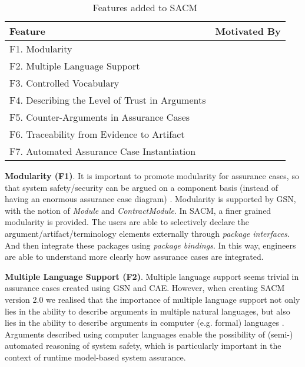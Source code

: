 \begin{table}[ht!]
	\centering
	\vspace{-1em}
	\begin{tabular}{|l|l|}
		\hline
		\textbf{Feature}               & \multicolumn{1}{c|}{\textbf{Motivated By}}                        \\ \hline
		F1. Modularity            & \multicolumn{1}{c|}{\cite{despotou2008investigating}} \\ \hline
		F2. Multiple Language Support &\multicolumn{1}{c|}{\cite{denney2013formal}}                  \\ \hline
		F3. Controlled Vocabulary &\multicolumn{1}{c|}{\cite{luo2015safety, attwood2014use}}                  \\ \hline
		F4. Describing the Level of Trust in Arguments &\multicolumn{1}{c|}{\cite{hawkins2011new, fenn2005putting}}                  \\ \hline
		F5. Counter-Arguments in Assurance Cases &\multicolumn{1}{c|}{\cite{armstrong2004deconstruction}}                  \\ \hline
		F6. Traceability from Evidence to Artifact &\multicolumn{1}{c|}{\cite{taguchi2014linking}}                  \\ \hline
		F7. Automated Assurance Case Instantiation &\multicolumn{1}{c|}{\cite{hawkins2015need, hawkins2015weaving}}                  \\ \hline
	\end{tabular}
	\caption{Features added to SACM}
	\label{tab:feature}
\end{table}

\textbf{Modularity (F1)}. It is important to promote modularity for assurance cases, so that system safety/security can be argued on a component basis (instead of having an enormous assurance case diagram) \cite{despotou2008investigating}. 
Modularity is supported by GSN, with the notion of \textit{Module} and \textit{ContractModule}.
In SACM, a finer grained modularity is provided. 
The users are able to selectively declare the argument/artifact/terminology elements externally through \textit{package interfaces}. 
And then integrate these packages using \textit{package bindings}.
In this way, engineers are able to understand more clearly how assurance cases are integrated.

\textbf{Multiple Language Support (F2)}. Multiple language support seems trivial in assurance cases created using GSN and CAE.
However, when creating SACM version 2.0 we realised that the importance of multiple language support not only lies in the ability to describe arguments in multiple natural languages, but also lies in the ability to describe arguments in computer (e.g. formal) languages \cite{denney2013formal}.
Arguments described using computer languages enable the possibility of (semi-) automated reasoning of system safety, which is particularly important in the context of runtime model-based system assurance.

